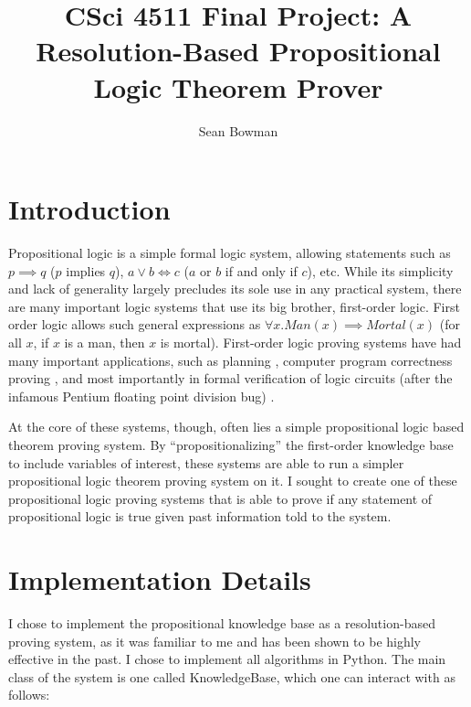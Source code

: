 \documentclass[english]{article}
\begin{document}
\title{CSci 4511 Final Project: A Resolution-Based Propositional Logic Theorem
Prover}


\author{Sean Bowman}

\maketitle

\section{Introduction}

Propositional logic is a simple formal logic system, allowing statements
such as $p\implies q$ ($p$ implies $q$), $a\lor b\iff c$ ($a$
or $b$ if and only if $c$), etc. While its simplicity and lack of
generality largely precludes its sole use in any practical system,
there are many important logic systems that use its big brother, first-order
logic. First order logic allows such general expressions as $\forall x.Man(x)\implies Mortal(x)$
(for all $x$, if $x$ is a man, then $x$ is mortal). First-order
logic proving systems have had many important applications, such as
planning \cite{STRIPSPaper}, computer program correctness proving
\cite{Hoare:1969:ABC:363235.363259}, and most importantly in formal
verification of logic circuits (after the infamous Pentium floating
point division bug) \cite{Miller95formalverification}. 

At the core of these systems, though, often lies a simple propositional
logic based theorem proving system. By {}``propositionalizing''
the first-order knowledge base to include variables of interest, these
systems are able to run a simpler propositional logic theorem proving
system on it. I sought to create one of these propositional logic
proving systems that is able to prove if any statement of propositional
logic is true given past information told to the system.


\section{Implementation Details}

I chose to implement the propositional knowledge base as a resolution-based
proving system, as it was familiar to me and has been shown to be
highly effective in the past. I chose to implement all algorithms
in Python. The main class of the system is one called KnowledgeBase,
which one can interact with as follows:
\end{document}

